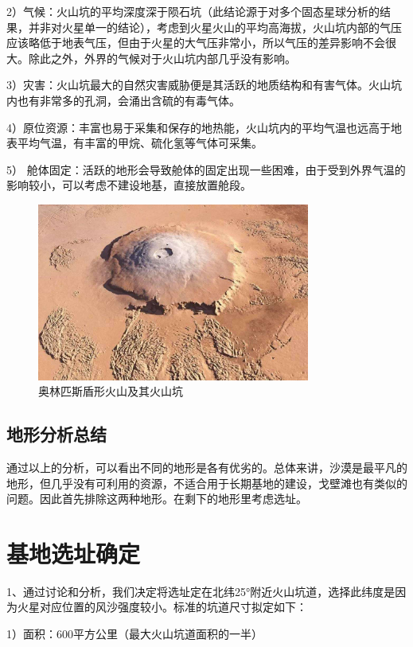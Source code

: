 2）气候：火山坑的平均深度深于陨石坑（此结论源于对多个固态星球分析的结果，并非对火星单一的结论），考虑到火星火山的平均高海拔，火山坑内部的气压应该略低于地表气压，但由于火星的大气压非常小，所以气压的差异影响不会很大。除此之外，外界的气候对于火山坑内部几乎没有影响。

3）灾害：火山坑最大的自然灾害威胁便是其活跃的地质结构和有害气体。火山坑内也有非常多的孔洞，会涌出含硫的有毒气体。

4）原位资源：丰富也易于采集和保存的地热能，火山坑内的平均气温也远高于地表平均气温，有丰富的甲烷、硫化氢等气体可采集。

5） 舱体固定：活跃的地形会导致舱体的固定出现一些困难，由于受到外界气温的影响较小，可以考虑不建设地基，直接放置舱段。

\begin{figure}[H]
  \centering
  \includegraphics[width=0.8\textwidth]{figure/huoshankeng.png}
  \caption{奥林匹斯盾形火山及其火山坑}
\end{figure}

\subsection{地形分析总结}

通过以上的分析，可以看出不同的地形是各有优劣的。总体来讲，沙漠是最平凡的地形，但几乎没有可利用的资源，不适合用于长期基地的建设，戈壁滩也有类似的问题。因此首先排除这两种地形。在剩下的地形里考虑选址。

\section{基地选址确定}

1、通过讨论和分析，我们决定将选址定在北纬25°附近火山坑道，选择此纬度是因为火星对应位置的风沙强度较小。标准的坑道尺寸拟定如下：

1）面积：600平方公里（最大火山坑道面积的一半）

